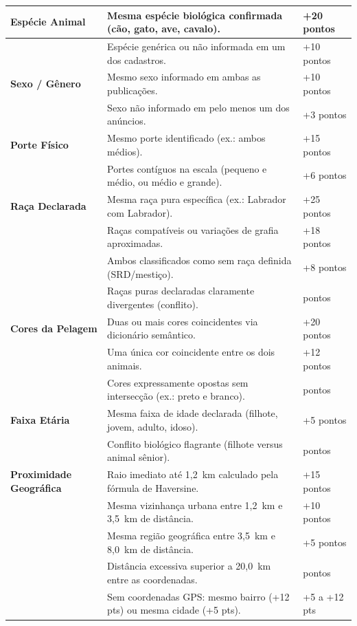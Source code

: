 {\begin{longtable}{|>{\raggedright\arraybackslash}p{3.3cm}|>{\raggedright\arraybackslash}p{8.4cm}|>{\centering\arraybackslash}p{2.5cm}|}
\textbf{Espécie Animal} & Mesma espécie biológica confirmada (cão, gato, ave, cavalo). & +20 pontos \\ \cline{2-3}
& Espécie genérica ou não informada em um dos cadastros. & +10 pontos \\ \hline
\textbf{Sexo / Gênero} & Mesmo sexo informado em ambas as publicações. & +10 pontos \\ \cline{2-3}
& Sexo não informado em pelo menos um dos anúncios. & +3 pontos \\ \hline
\textbf{Porte Físico} & Mesmo porte identificado (ex.: ambos médios). & +15 pontos \\ \cline{2-3}
& Portes contíguos na escala (pequeno e médio, ou médio e grande). & +6 pontos \\ \hline
\textbf{Raça Declarada} & Mesma raça pura específica (ex.: Labrador com Labrador). & +25 pontos \\ \cline{2-3}
& Raças compatíveis ou variações de grafia aproximadas. & +18 pontos \\ \cline{2-3}
& Ambos classificados como sem raça definida (SRD/mestiço). & +8 pontos \\ \cline{2-3}
& Raças puras declaradas claramente divergentes (conflito). & -20 pontos \\ \hline
\textbf{Cores da Pelagem} & Duas ou mais cores coincidentes via dicionário semântico. & +20 pontos \\ \cline{2-3}
& Uma única cor coincidente entre os dois animais. & +12 pontos \\ \cline{2-3}
& Cores expressamente opostas sem intersecção (ex.: preto e branco). & -25 pontos \\ \hline
\textbf{Faixa Etária} & Mesma faixa de idade declarada (filhote, jovem, adulto, idoso). & +5 pontos \\ \cline{2-3}
& Conflito biológico flagrante (filhote versus animal sênior). & -15 pontos \\ \hline
\textbf{Proximidade Geográfica} & Raio imediato até 1,2~km calculado pela fórmula de Haversine. & +15 pontos \\ \cline{2-3}
& Mesma vizinhança urbana entre 1,2~km e 3,5~km de distância. & +10 pontos \\ \cline{2-3}
& Mesma região geográfica entre 3,5~km e 8,0~km de distância. & +5 pontos \\ \cline{2-3}
& Distância excessiva superior a 20,0~km entre as coordenadas. & -15 pontos \\ \cline{2-3}
& Sem coordenadas GPS: mesmo bairro (+12 pts) ou mesma cidade (+5 pts). & +5 a +12 pts \\ \hline
\end{longtable}
}

